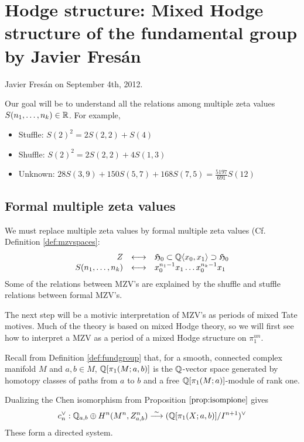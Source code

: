 \chapter{Hodge structure: Mixed Hodge structure of the fundamental group by Javier Fres\'an}

Javier Fres\'an on September 4th, 2012.

\medskip
\medskip

\noindent Our goal will be to understand all the relations among multiple zeta values $S(n_1, \ldots, n_k) \in \mathbb{R}$. For example,
\begin{itemize}
\item Stuffle: $S(2)^2 = 2 S(2,2) + S(4)$
\item Shuffle: $S(2)^2 = 2 S(2,2) + 4 S(1,3)$
\item Unknown: $28 S(3, 9) + 150 S(5,7) + 168 S(7,5) = \frac{5197}{691}S(12)$
\end{itemize}

\section{Formal multiple zeta values}

We must replace multiple zeta values by formal multiple zeta values (Cf. Definition \ref{def:mzvspaces}:
\[
\begin{array}{rcl}
Z & \longleftrightarrow & \mathfrak{H}_0 \subset \mathbb{Q}\langle x_0, x_1 \rangle \supset \mathfrak{H}_0 \\
S(n_1, \ldots, n_k) & \longleftrightarrow & x_0^{n_1-1} x_1 \ldots x_0^{n_k-1} x_1
\end{array}
\]
Some of the relations between MZV's are explained by the shuffle and stuffle relations between formal MZV's.

The next step will be a motivic interpretation of MZV's as periods of mixed Tate motives. Much of the theory is based on mixed Hodge theory, so we will first see how to interpret a MZV as a period of a mixed Hodge structure on $\pi_1^{un}$.

Recall from Definition \ref{def:fundgroup} that, for a smooth, connected complex manifold $M$ and $a, b \in M$, $\mathbb{Q}[\pi_1(M;a,b)]$ is the $\mathbb{Q}$-vector space generated by homotopy classes of paths from $a$ to $b$ and a free $\mathbb{Q}[\pi_1(M;a)]$-module of rank one.

Dualizing the Chen isomorphism from Proposition $\ref{prop:isompione}$ gives
\[
c_n^{\vee} : \mathbb{Q}_{a,b} \oplus H^n(M^n, Z^n_{a,b}) \stackrel{\sim}{\longrightarrow} (\mathbb{Q}[\pi_1(X; a, b)]/I^{n+1})^{\vee}
\]
These form a directed system. 

